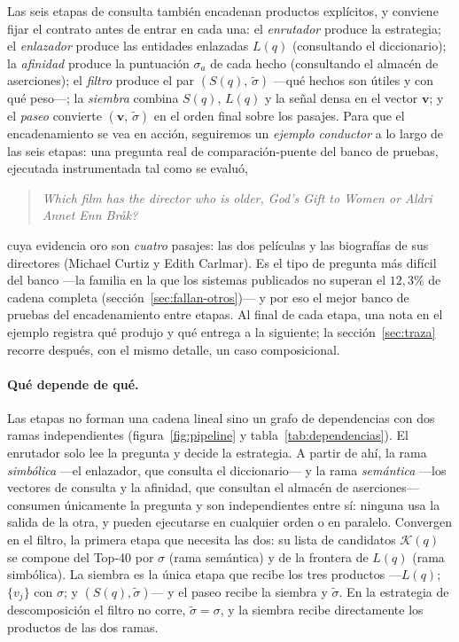 \documentclass[11pt,a4paper]{article}
\begin{document}
Las seis etapas de consulta también encadenan productos explícitos, y
conviene fijar el contrato antes de entrar en cada una: el
\emph{enrutador} produce la estrategia; el \emph{enlazador} produce las
entidades enlazadas $L(q)$ (consultando el diccionario); la
\emph{afinidad} produce la puntuación $\sigma_a$ de cada hecho
(consultando el almacén de aserciones); el \emph{filtro} produce el par
$(S(q),\,\tilde\sigma)$ ---qué hechos son útiles y con qué peso---; la
\emph{siembra} combina $S(q)$, $L(q)$ y la señal densa en el vector
$\mathbf{v}$; y el \emph{paseo} convierte $(\mathbf{v},\,\tilde\sigma)$ en
el orden final sobre los pasajes. Para que el encadenamiento se vea en
acción, seguiremos un \emph{ejemplo conductor} a lo largo de las seis
etapas: una pregunta real de comparación-puente del banco de pruebas,
ejecutada instrumentada tal como se evaluó,
\begin{quote}
\emph{\guillemotleft{}Which film has the director who is older, God's Gift to Women or
Aldri Annet Enn Bråk?\guillemotright{}}
\end{quote}
cuya evidencia oro son \emph{cuatro} pasajes: las dos películas y las
biografías de sus directores (Michael Curtiz y Edith Carlmar). Es el tipo
de pregunta más difícil del banco ---la familia en la que los sistemas
publicados no superan el $12{,}3\%$ de cadena completa
(sección~\ref{sec:fallan-otros})--- y por eso el mejor banco de pruebas
del encadenamiento entre etapas. Al final de cada etapa, una nota
\guillemotleft{}en el ejemplo\guillemotright{} registra qué produjo y qué entrega a la siguiente;
la sección~\ref{sec:traza} recorre después, con el mismo detalle, un caso
composicional.

\paragraph{Qué depende de qué.}
Las etapas no forman una cadena lineal sino un grafo de dependencias con
dos ramas independientes (figura~\ref{fig:pipeline} y
tabla~\ref{tab:dependencias}). El enrutador solo lee la pregunta y decide
la estrategia. A partir de ahí, la rama \emph{simbólica} ---el enlazador,
que consulta el diccionario--- y la rama \emph{semántica} ---los vectores
de consulta y la afinidad, que consultan el almacén de aserciones---
consumen únicamente la pregunta y son independientes entre sí: ninguna
usa la salida de la otra, y pueden ejecutarse en cualquier orden o en
paralelo. Convergen en el filtro, la primera etapa que necesita las dos:
su lista de candidatos $\mathcal{K}(q)$ se compone del Top-40 por
$\sigma$ (rama semántica) y de la frontera de $L(q)$ (rama simbólica).
La siembra es la única etapa que recibe los tres productos ---$L(q)$;
$\{v_j\}$ con $\sigma$; y $(S(q),\tilde\sigma)$--- y el paseo recibe la
siembra y $\tilde\sigma$. En la estrategia de descomposición el filtro no
corre, $\tilde\sigma=\sigma$, y la siembra recibe directamente los
productos de las dos ramas.
\end{document}
